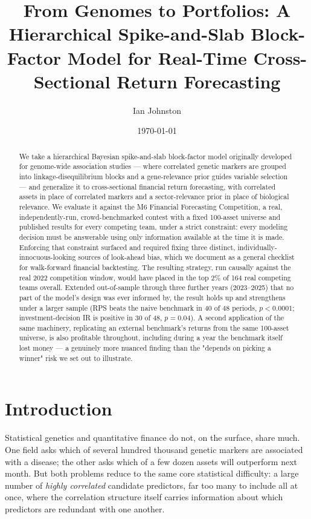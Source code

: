 \documentclass[11pt]{article}
\title{From Genomes to Portfolios: A Hierarchical Spike-and-Slab Block-Factor
Model for Real-Time Cross-Sectional Return Forecasting}
\author{Ian Johnston}
\date{\today}
\begin{document}
\maketitle

\begin{abstract}
We take a hierarchical Bayesian spike-and-slab block-factor model originally
developed for genome-wide association studies --- where correlated genetic
markers are grouped into linkage-disequilibrium blocks and a gene-relevance
prior guides variable selection --- and generalize it to cross-sectional
financial return forecasting, with correlated assets in place of correlated
markers and a sector-relevance prior in place of biological relevance. We
evaluate it against the M6 Financial Forecasting Competition, a real,
independently-run, crowd-benchmarked contest with a fixed 100-asset universe
and published results for every competing team, under a strict constraint:
every modeling decision must be answerable using only information available
at the time it is made. Enforcing that constraint surfaced and required fixing
three distinct, individually-innocuous-looking sources of look-ahead bias, which
we document as a general checklist for walk-forward financial backtesting. The
resulting strategy, run causally against the real 2022 competition window,
would have placed in the top 2\% of 164 real competing teams overall. Extended
out-of-sample through three further years (2023--2025) that no part of the
model's design was ever informed by, the result holds up and strengthens under
a larger sample (RPS beats the naive benchmark in 40 of 48 periods,
$p<0.0001$; investment-decision IR is positive in 30 of 48, $p=0.04$). A second
application of the same machinery, replicating an external benchmark's returns
from the same 100-asset universe, is also profitable throughout, including
during a year the benchmark itself lost money --- a genuinely more nuanced
finding than the "depends on picking a winner" risk we set out to illustrate.
\end{abstract}

\tableofcontents

\section{Introduction}

Statistical genetics and quantitative finance do not, on the surface, share
much. One field asks which of several hundred thousand genetic markers are
associated with a disease; the other asks which of a few dozen assets will
outperform next month. But both problems reduce to the same core statistical
difficulty: a large number of \emph{highly correlated} candidate predictors,
far too many to include all at once, where the correlation structure itself
carries information about which predictors are redundant with one another.
\end{document}

